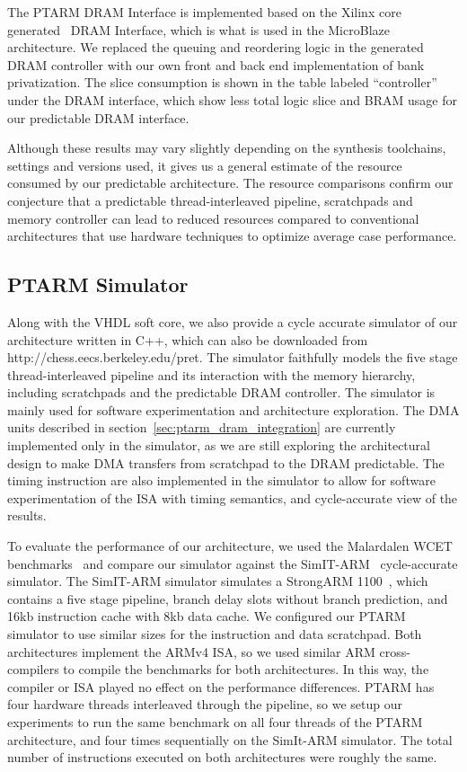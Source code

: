 The PTARM DRAM Interface is implemented based on the Xilinx core generated~\cite{xilinx_coregen} DRAM Interface, which is what is used in the MicroBlaze architecture. 
We replaced the queuing and reordering logic in the generated DRAM controller with our own front and back end implementation of bank privatization. 
The slice consumption is shown in the table labeled ``controller'' under the DRAM interface, which show less total logic slice and BRAM usage for our predictable DRAM interface.  

Although these results may vary slightly depending on the synthesis toolchains, settings and versions used, it gives us a general estimate of the resource consumed by our predictable architecture. 
The resource comparisons confirm our conjecture that a predictable thread-interleaved pipeline, scratchpads and memory controller can lead to reduced resources compared to conventional architectures that use hardware techniques to optimize average case performance. 	 
  
\subsection{PTARM Simulator}
\label{sec:ptarm_sim}
Along with the VHDL soft core, we also provide a cycle accurate simulator of our architecture written in C++, which can also be downloaded from http://chess.eecs.berkeley.edu/pret. 
The simulator faithfully models the five stage thread-interleaved pipeline and its interaction with the memory hierarchy, including scratchpads and the predictable DRAM controller.
The simulator is mainly used for software experimentation and architecture exploration.    
The DMA units described in section~\ref{sec:ptarm_dram_integration} are currently implemented only in the simulator, as we are still exploring the architectural design to make DMA transfers from scratchpad to the DRAM predictable. 
The timing instruction are also implemented in the simulator to allow for software experimentation of the ISA with timing semantics, and cycle-accurate view of the results.

To evaluate the performance of our architecture, we used the Malardalen WCET benchmarks~\cite{Gustafsson:WCET2010:Benchmarks} and compare our simulator against the SimIT-ARM~\cite{Qin:2003:FFM:789083.1022785} cycle-accurate simulator.
The SimIT-ARM simulator simulates a StrongARM 1100~\cite{intel-sa-1100}, which contains a five stage pipeline, branch delay slots without branch prediction, and 16kb instruction cache with 8kb data cache.
We configured our PTARM simulator to use similar sizes for the instruction and data scratchpad.
Both architectures implement the ARMv4 ISA, so we used similar ARM cross-compilers to compile the benchmarks for both architectures.
In this way, the compiler or ISA played no effect on the performance differences. 
PTARM has four hardware threads interleaved through the pipeline, so we setup our experiments to run the same benchmark on all four threads of the PTARM architecture, and four times sequentially on the SimIt-ARM simulator.
The total number of instructions executed on both architectures were roughly the same.  

